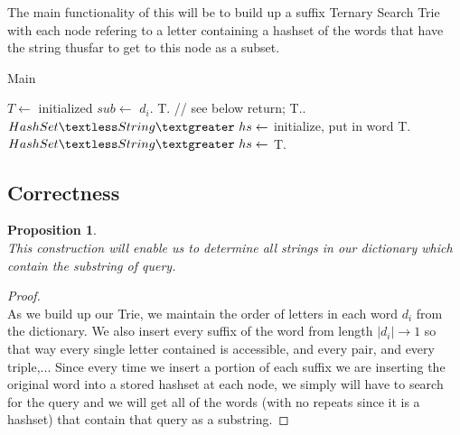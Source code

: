 \documentclass[12pt]{article}
\newtheorem{proposition}[theorem]{Proposition}
\begin{document}
The main functionality of this will be to build up a suffix Ternary Search Trie with each node refering to a letter
containing a hashset of the words that have the string thusfar to get to this node as a subset.

\begin{algorithm}[H]
\caption{Main}
\begin{algorithmic}
        \State $T \gets$ initialized
                \State $sub \gets$ $d_i$.
                \State T. // see below
            \EndFor
        \EndFor
    \EndProcedure
                    return;
                \Else
                    \State T..
                \EndIf
            \Else
                \State $HashSet\textless String\textgreater\ hs \gets$ initialize, put in word
                \State T.
            \EndIf
        \EndFor
    \EndProcedure
        \State $HashSet\textless String\textgreater\ hs \gets$ T.
            \State {}
        \EndFor
    \EndProcedure
\end{algorithmic}
\end{algorithm}



\subsection{Correctness}
\begin{proposition}
~ \\ \indent This construction will enable us to determine all strings in our dictionary which contain the
substring of query.
\end{proposition}

\begin{proof}
~ \\ \indent As we build up our Trie, we maintain the order of letters in each word $d_i$ from the dictionary.
We also insert every suffix of the word from length $|d_i| \rightarrow 1$ so that way every single letter contained
is accessible, and every pair, and every triple,... Since every time we insert a portion of each suffix we are
inserting the original word into a stored hashset at each node, we simply will have to search for the query and
we will get all of the words (with no repeats since it is a hashset) that contain that query as a substring.
\end{proof}
\end{document}
